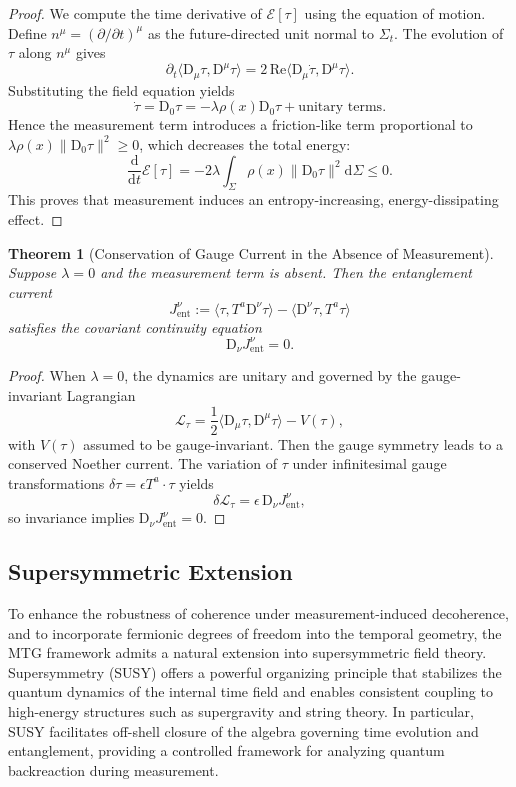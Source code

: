\documentclass[11pt]{article}
\newtheorem{theorem}{Theorem}
\begin{document}
\begin{proof}
We compute the time derivative of $\mathcal{E}[\tau]$ using the equation of motion. Define $n^\mu = (\partial / \partial t)^\mu$ as the future-directed unit normal to $\Sigma_t$. The evolution of $\tau$ along $n^\mu$ gives
\[
\partial_t \langle \mathrm{D}_\mu \tau, \mathrm{D}^\mu \tau \rangle = 2 \, \mathrm{Re} \langle \mathrm{D}_\mu \dot{\tau}, \mathrm{D}^\mu \tau \rangle.
\]
Substituting the field equation yields
\[
\dot{\tau} = \mathrm{D}_0 \tau = - \lambda \rho(x) \mathrm{D}_0 \tau + \text{unitary terms}.
\]
Hence the measurement term introduces a friction-like term proportional to $\lambda \rho(x) \| \mathrm{D}_0 \tau \|^2 \geq 0$, which decreases the total energy:
\[
\frac{\mathrm{d}}{\mathrm{d}t} \mathcal{E}[\tau] = -2 \lambda \int_\Sigma \rho(x) \| \mathrm{D}_0 \tau \|^2 \mathrm{d} \Sigma \leq 0.
\]
This proves that measurement induces an entropy-increasing, energy-dissipating effect.
\end{proof}

\begin{theorem}[Conservation of Gauge Current in the Absence of Measurement]
Suppose $\lambda = 0$ and the measurement term is absent. Then the entanglement current
\[
J^\nu_{\mathrm{ent}} := \langle \tau, T^a \mathrm{D}^\nu \tau \rangle - \langle \mathrm{D}^\nu \tau, T^a \tau \rangle
\]
satisfies the covariant continuity equation
\[
\mathrm{D}_\nu J^\nu_{\mathrm{ent}} = 0.
\]
\end{theorem}

\begin{proof}
When $\lambda = 0$, the dynamics are unitary and governed by the gauge-invariant Lagrangian
\[
\mathcal{L}_\tau = \frac{1}{2} \langle \mathrm{D}_\mu \tau, \mathrm{D}^\mu \tau \rangle - V(\tau),
\]
with $V(\tau)$ assumed to be gauge-invariant. Then the gauge symmetry leads to a conserved Noether current. The variation of $\tau$ under infinitesimal gauge transformations $\delta \tau = \epsilon T^a \cdot \tau$ yields
\[
\delta \mathcal{L}_\tau = \epsilon \, \mathrm{D}_\nu J^\nu_{\mathrm{ent}},
\]
so invariance implies $\mathrm{D}_\nu J^\nu_{\mathrm{ent}} = 0$.
\end{proof}
\subsection{Supersymmetric Extension}

To enhance the robustness of coherence under measurement-induced decoherence, and to incorporate fermionic degrees of freedom into the temporal geometry, the MTG framework admits a natural extension into supersymmetric field theory. Supersymmetry (SUSY) offers a powerful organizing principle that stabilizes the quantum dynamics of the internal time field and enables consistent coupling to high-energy structures such as supergravity and string theory. In particular, SUSY facilitates off-shell closure of the algebra governing time evolution and entanglement, providing a controlled framework for analyzing quantum backreaction during measurement.
\end{document}
